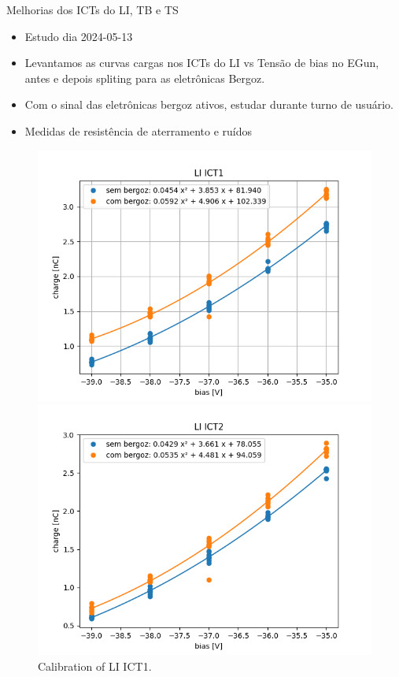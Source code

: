 \documentclass[aspectratio=169]{beamer}            %
\begin{document}
\begin{frame}{Melhorias dos ICTs do LI, TB e TS}

{\footnotesize
\begin{itemize}
    \item Estudo dia 2024-05-13
    \item Levantamos as curvas cargas nos ICTs do LI vs Tensão de bias no EGun, antes e depois spliting para as eletrônicas Bergoz.
    \item Com o sinal das eletrônicas bergoz ativos, estudar durante turno de usuário.
    \item Medidas de resistência de aterramento e ruídos
\end{itemize}
}
\begin{figure}[ht]
    \begin{minipage}[b]{0.45\linewidth}
        \centering
        \includegraphics[width=\textwidth]{2024-05-31/figures/li-ict1.png}
        \caption{Calibration of LI ICT1.}
        \label{fig:a}
    \end{minipage}
    \hspace{0.5cm}
    \begin{minipage}[b]{0.45\linewidth}
        \centering
        \includegraphics[width=\textwidth]{2024-05-31/figures/li-ict2.png}

\end{minipage}
\end{figure}
\end{frame}
\end{document}
